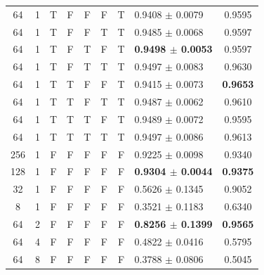 \begin{tabular}{c c c c c c c l c}
64 & 1 & T & F & F & F & T & 0.9408 $\pm$ 0.0079 & 0.9595 \\
64 & 1 & T & F & F & T & T & 0.9485 $\pm$ 0.0068 & 0.9597 \\
64 & 1 & T & F & T & F & T & \textbf{0.9498 $\pm$ 0.0053} & 0.9597 \\
64 & 1 & T & F & T & T & T & 0.9497 $\pm$ 0.0083 & 0.9630 \\
64 & 1 & T & T & F & F & T & 0.9415 $\pm$ 0.0073 & \textbf{0.9653} \\
64 & 1 & T & T & F & T & T & 0.9487 $\pm$ 0.0062 & 0.9610 \\
64 & 1 & T & T & T & F & T & 0.9489 $\pm$ 0.0072 & 0.9595 \\
64 & 1 & T & T & T & T & T & 0.9497 $\pm$ 0.0086 & 0.9613 \\
\midrule
256 & 1 & F & F & F & F & F & 0.9225 $\pm$ 0.0098 & 0.9340 \\
128 & 1 & F & F & F & F & F & \textbf{0.9304 $\pm$ 0.0044} & \textbf{0.9375} \\
32 & 1 & F & F & F & F & F & 0.5626 $\pm$ 0.1345 & 0.9052 \\
8 & 1 & F & F & F & F & F & 0.3521 $\pm$ 0.1183 & 0.6340 \\
\midrule
64 & 2 & F & F & F & F & F & \textbf{0.8256 $\pm$ 0.1399} & \textbf{0.9565} \\
64 & 4 & F & F & F & F & F & 0.4822 $\pm$ 0.0416 & 0.5795 \\
64 & 8 & F & F & F & F & F & 0.3788 $\pm$ 0.0806 & 0.5045 \\
\bottomrule
\end{tabular}

